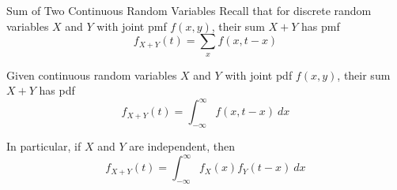 \documentclass[handout]{beamer}
\renewcommand{\emph}{\textbf}
\begin{document}

\begin{frame}{Sum of Two Continuous Random Variables}
Recall that for discrete random variables $X$ and $Y$ with joint pmf $f(x,y)$, their sum $X+Y$ has pmf
$$f_{X+Y}(t) = \sum_x f(x,t-x)$$
\pause\vspace{-.3cm} \begin{block}{}
Given continuous random variables $X$ and $Y$ with joint pdf $f(x,y)$, their sum $X+Y$ has pdf
$$f_{X+Y}(t) = \int_{-\infty}^\infty f(x,t-x)\ dx$$
\end{block}
In particular, if $X$ and $Y$ are independent, then
$$f_{X+Y}(t) = \int_{-\infty}^\infty f_X(x)f_Y(t-x)\ dx$$
\end{frame}
\end{document}
